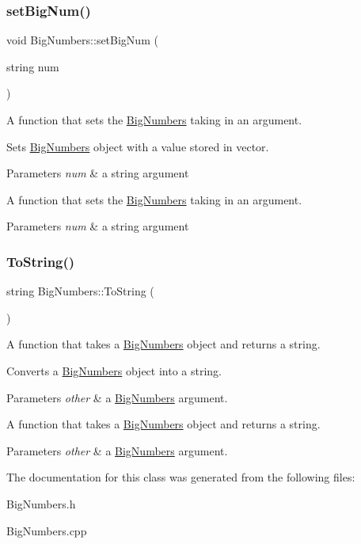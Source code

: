 \subsubsection{\texorpdfstring{set\+Big\+Num()}{setBigNum()}}
{\footnotesize\ttfamily void Big\+Numbers\+::set\+Big\+Num (\begin{DoxyParamCaption}\item[{string}]{num }\end{DoxyParamCaption})}



A function that sets the \mbox{\hyperlink{class_big_numbers}{Big\+Numbers}} taking in an argument. 

Sets \mbox{\hyperlink{class_big_numbers}{Big\+Numbers}} object with a value stored in vector. 
\begin{DoxyParams}{Parameters}
{\em num} & a string argument\\
\hline
\end{DoxyParams}
A function that sets the \mbox{\hyperlink{class_big_numbers}{Big\+Numbers}} taking in an argument. 
\begin{DoxyParams}{Parameters}
{\em num} & a string argument \\
\hline
\end{DoxyParams}
\mbox{\label{class_big_numbers_a326c5e36f8b346e85050909536a1a666}} 
\subsubsection{\texorpdfstring{To\+String()}{ToString()}}
{\footnotesize\ttfamily string Big\+Numbers\+::\+To\+String (\begin{DoxyParamCaption}{ }\end{DoxyParamCaption})}



A function that takes a \mbox{\hyperlink{class_big_numbers}{Big\+Numbers}} object and returns a string. 

Converts a \mbox{\hyperlink{class_big_numbers}{Big\+Numbers}} object into a string. 
\begin{DoxyParams}{Parameters}
{\em other} & a \mbox{\hyperlink{class_big_numbers}{Big\+Numbers}} argument.\\
\hline
\end{DoxyParams}
A function that takes a \mbox{\hyperlink{class_big_numbers}{Big\+Numbers}} object and returns a string. 
\begin{DoxyParams}{Parameters}
{\em other} & a \mbox{\hyperlink{class_big_numbers}{Big\+Numbers}} argument. \\
\hline
\end{DoxyParams}


The documentation for this class was generated from the following files\+:\begin{DoxyCompactItemize}
\item 
Big\+Numbers.\+h\item 
Big\+Numbers.\+cpp\end{DoxyCompactItemize}
